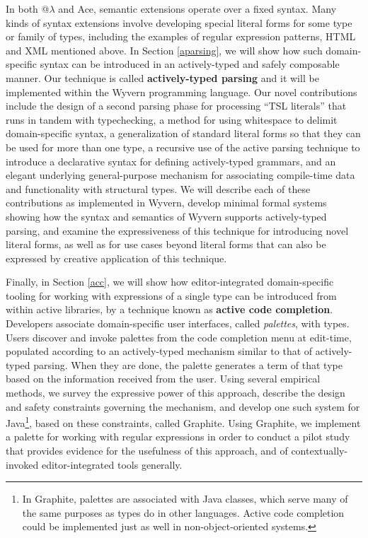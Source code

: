 In both @$\lambda$ and Ace, semantic extensions operate over a fixed syntax. Many kinds of syntax extensions involve developing special literal forms for some type or family of types, including the examples of regular expression patterns, HTML and XML mentioned above. In Section \ref{aparsing}, we will show how such domain-specific syntax can be introduced in an actively-typed and safely composable manner. Our technique is called \textbf{actively-typed parsing} and it will be implemented within the Wyvern programming language.  Our novel contributions include the design of a second parsing phase for processing ``TSL literals'' that runs in tandem with typechecking, a method for using whitespace to delimit domain-specific syntax, a generalization of standard literal forms so that they can be used for more than one type, a recursive use of the active parsing technique to introduce a declarative syntax for defining actively-typed grammars, and an elegant underlying general-purpose mechanism for associating compile-time data and functionality with structural types. We will describe each of these contributions as implemented in Wyvern, develop minimal formal systems showing how the syntax and semantics of Wyvern supports actively-typed parsing, and examine the expressiveness of this technique for introducing novel literal forms, as well as for use cases beyond literal forms that can also be expressed by creative application of this technique.

Finally, in Section \ref{acc}, we will show how editor-integrated domain-specific tooling for working with expressions of a single type can be introduced from within active libraries, by a technique known as \textbf{active code completion}. Developers associate
domain-specific user interfaces, called \emph{palettes}, with types. Users discover and invoke palettes from the code completion menu at edit-time, populated according to an actively-typed mechanism similar to that of actively-typed parsing. When they are done, the palette generates a term of that type based on the information received from the user. Using several empirical
methods, we survey\- the expressive power of this approach, describe the design and safety constraints governing
the mechanism, and develop one such system for Java\footnote{In Graphite, palettes are associated with Java classes, which serve many of the same purposes as types do in other languages. Active code completion could be implemented just as well in non-object-oriented systems.}, based on these constraints, called Graphite. Using Graphite,
we implement a palette for working with regular expressions in order to conduct a pilot study that provides evidence for the usefulness of this approach, and of contextually-invoked editor-integrated tools generally.

